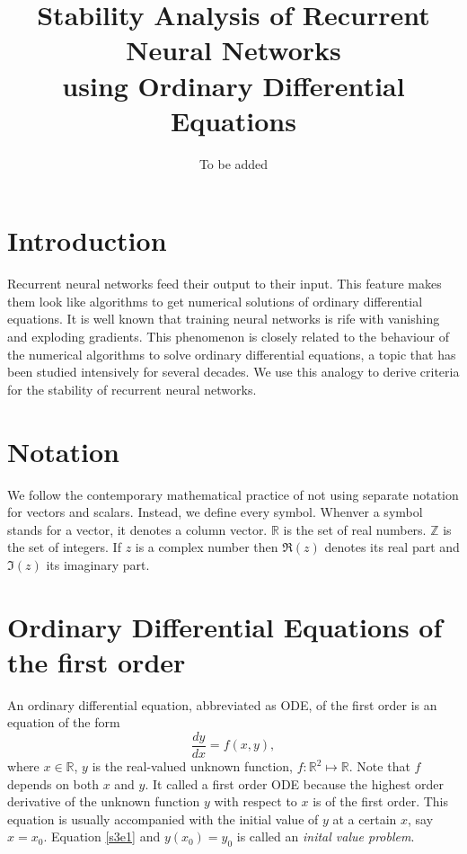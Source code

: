 \documentclass{article}
\numberwithin{equation}{section}
\begin{document}
\title{Stability Analysis of Recurrent Neural Networks \\
    using Ordinary Differential Equations}
\author{To be added}
\maketitle
\section{Introduction}\label{s1}
Recurrent neural networks feed their output to their input. This feature
makes them look like algorithms to get numerical solutions of ordinary
differential equations. It is well known that training neural networks is
rife with vanishing and exploding gradients\cite{gereon2018hands}. This
phenomenon is closely related to the behaviour of the numerical algorithms
to solve ordinary differential equations, a topic that has been studied
intensively for several decades. We use this analogy to derive criteria for
the stability of recurrent neural networks.

\section{Notation}\label{s2}
We follow the contemporary mathematical practice of not using separate
notation for vectors and scalars. Instead, we define every symbol. Whenver
a symbol stands for a vector, it denotes a column vector. $\mathbb{R}$ is 
the set of real numbers. $\mathbb{Z}$ is the set of integers. If $z$ is
a complex number then $\Re(z)$ denotes its real part and $\Im(z)$ its
imaginary part.

\section{Ordinary Differential Equations of the first order}\label{s3}
An ordinary differential equation, abbreviated as ODE, of the first order 
is an equation of the form
\begin{equation}\label{s3e1}
\frac{dy}{dx} = f(x, y),
\end{equation}
where $x \in \mathbb{R}$, $y$ is the real-valued unknown function, $f: 
\mathbb{R}^2 \mapsto \mathbb{R}$. Note that $f$ depends on both $x$ and 
$y$. It called a first order ODE because the highest order derivative
of the unknown function $y$ with respect to $x$ is of the first order.
This equation is usually accompanied with the initial value of $y$ at a 
certain $x$, say $x = x_0$. Equation \eqref{s3e1} and $y(x_0) = y_0$ is
called an \emph{inital value problem}.
\end{document}
